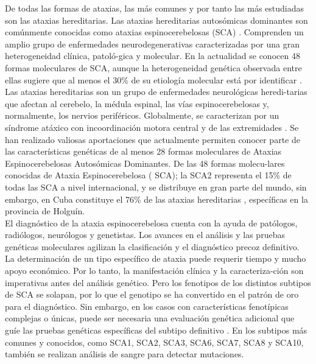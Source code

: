 \documentclass[a4paper,12pt]{article}
\begin{document}
De todas las formas de ataxias, las más comunes y por tanto las más estudiadas son las ataxias hereditarias.  Las ataxias hereditarias autosómicas dominantes son comúnmente conocidas como ataxias espinocerebelosas (SCA) \cite{mascalchi_neuroimaging_2020,rodriguez-labrada_founder_2020,prooije_spinocerebellar_2021}. Comprenden un amplio grupo de enfermedades neurodegenerativas caracterizadas por una gran heterogeneidad clínica, patoló-gica y molecular. En la actualidad se conocen 48 formas moleculares de SCA, aunque la heterogeneidad genética observada entre ellas sugiere que al menos el 30\% de su etiología molecular está por identificar \cite{luis_velazquez_perez_ataxia_2012}. \\
Las ataxias hereditarias son un grupo de enfermedades neurológicas heredi-tarias que afectan al cerebelo, la médula espinal, las vías espinocerebelosas y, normalmente, los nervios periféricos. Globalmente, se caracterizan por un síndrome atáxico con incoordinación motora central y de las extremidades \cite{paap_standardized_2016,assistance_publique_-_hopitaux_de_paris_identification_2019}. 
Se han realizado valiosas aportaciones que actualmente permiten conocer parte de las características genéticas de al menos 28 formas moleculares de Ataxias Espinocerebelosas Autosómicas Dominantes. De las 48 formas molecu-lares conocidas de Ataxia Espinocerebelosa ( SCA); la SCA2 representa el 15\% de todas las SCA a nivel internacional, y se distribuye en gran parte del mundo, sin embargo, en Cuba constituye el 76\% de las ataxias hereditarias \cite{meira_neuroradiological_2019,bhandari_spinocerebellar_2022}, específicas en la provincia de Holguín. \\
El diagnóstico de la ataxia espinocerebelosa cuenta con la ayuda de patólogos, radiólogos, neurólogos y genetistas. Los avances en el análisis y las pruebas genéticas moleculares agilizan la clasificación y el diagnóstico precoz definitivo. La determinación de un tipo específico de ataxia puede requerir tiempo y mucho apoyo económico. Por lo tanto, la manifestación clínica y la caracteriza-ción son imperativas antes del análisis genético. Pero los fenotipos de los distintos subtipos de SCA se solapan, por lo que el genotipo se ha convertido en el patrón de oro para el diagnóstico. Sin embargo, en los casos con características fenotípicas complejas o únicas, puede ser necesaria una evaluación genética adicional que guíe las pruebas genéticas específicas del subtipo definitivo \cite{silva_diagnosis_2019}.  En los subtipos más comunes y conocidos, como SCA1, SCA2, SCA3, SCA6, SCA7, SCA8 y SCA10, también se realizan análisis de sangre para detectar mutaciones. 
\end{document}
